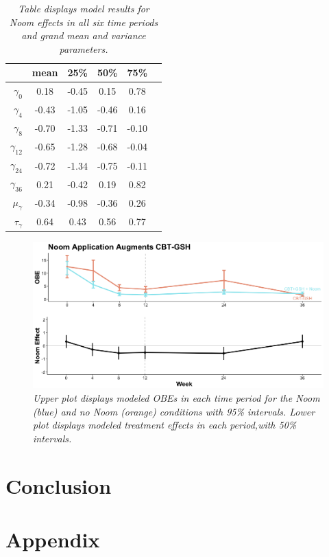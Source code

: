 \documentclass[12pt, oneside]{article}
\begin{document}
\begin{table}[t]
\centering
\begin{tabular}{r c c c c c}
  \hline
 & mean & 25\% & 50\% & 75\% \\ 
  \hline
  $\gamma_0$ & 0.18 & -0.45 & 0.15 & 0.78   \\ 
  $\gamma_4$ & -0.43 & -1.05 & -0.46 & 0.16   \\ 
  $\gamma_8$ & -0.70 & -1.33 & -0.71 & -0.10   \\  
  $\gamma_{12}$ & -0.65 & -1.28 & -0.68 & -0.04   \\  
  $\gamma_{24}$ & -0.72 & -1.34 & -0.75 & -0.11  \\  
  $\gamma_{36}$ & 0.21 & -0.42 & 0.19 & 0.82  \\ 
  \hline \hline
  $\mu_{\gamma}$ & -0.34 & -0.98 & -0.36 & 0.26  \\ 
  $\tau_{\gamma}$ & 0.64 & 0.43 & 0.56 & 0.77  \\ 
   \hline
\end{tabular}
\caption{\emph{Table displays model results for Noom effects in all six time periods and grand mean and variance parameters.}}
\end{table}


\begin{figure}[h]
\centering
\includegraphics[width=\textwidth, height=\textheight, keepaspectratio]{noom_effect.png}
\caption{\emph{Upper plot displays modeled OBEs in each time period for the Noom (blue) and no Noom (orange) conditions with 95\% intervals.  Lower plot displays modeled treatment effects in each period,with 50\% intervals.}}
\end{figure}


\section{Conclusion}


\section{Appendix}
\end{document}
